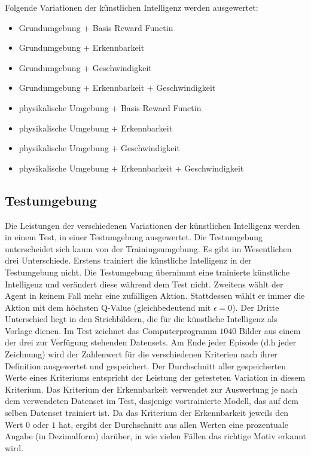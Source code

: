 Folgende Variationen der künstlichen Intelligenz werden ausgewertet:

\begin{itemize}
  \item Grundumgebung + Basis Reward Functin
  \item Grundumgebung + Erkennbarkeit
  \item Grundumgebung + Geschwindigkeit
  \item Grundumgebung + Erkennbarkeit + Geschwindigkeit
  \item physikalische Umgebung + Basis Reward Functin
  \item physikalische Umgebung + Erkennbarkeit
  \item physikalische Umgebung + Geschwindigkeit
  \item physikalische Umgebung + Erkennbarkeit + Geschwindigkeit
\end{itemize}


\subsection{Testumgebung}
\label{sub:m_auswert_test}

Die Leistungen der verschiedenen Variationen der künstlichen Intelligenz werden
in einem Test, in einer Testumgebung ausgewertet. Die Testumgebung unterscheidet
sich kaum von der Trainingsumgebung. Es gibt im Wesentlichen drei Unterschiede.
Erstens trainiert die künstliche Intelligenz in der Testumgebung nicht. Die
Testumgebung übernimmt eine trainierte künstliche Intelligenz und verändert
diese während dem Test nicht. Zweitens wählt der Agent in keinem Fall mehr eine
zufälligen Aktion. Stattdessen wählt er immer die Aktion mit dem höchsten
Q-Value (gleichbedeutend mit $\epsilon = 0$). Der Dritte Unterschied liegt in den Strichbildern, die
für die künstliche Intelligenz als Vorlage dienen. Im Test zeichnet das
Computerprogramm $1040$ Bilder aus einem der drei zur Verfügung stehenden
Datensets. Am Ende jeder Episode (d.h jeder Zeichnung) wird der Zahlenwert für
die verschiedenen Kriterien nach ihrer Definition ausgewertet und gespeichert.
Der Durchschnitt aller gespeicherten Werte eines Kriteriums entspricht der
Leistung der getesteten Variation in diesem Kriterium. Das Kriterium der
Erkennbarkeit verwendet zur Auswertung je nach dem verwendeten Datenset im Test,
dasjenige vortrainierte Modell, das auf dem selben Datenset trainiert ist. Da
das Kriterium der Erkennbarkeit jeweils den Wert $0$ oder $1$ hat, ergibt der
Durchschnitt aus allen Werten eine prozentuale Angabe (in Dezimalform) darüber,
in wie vielen Fällen das richtige Motiv erkannt wird.




